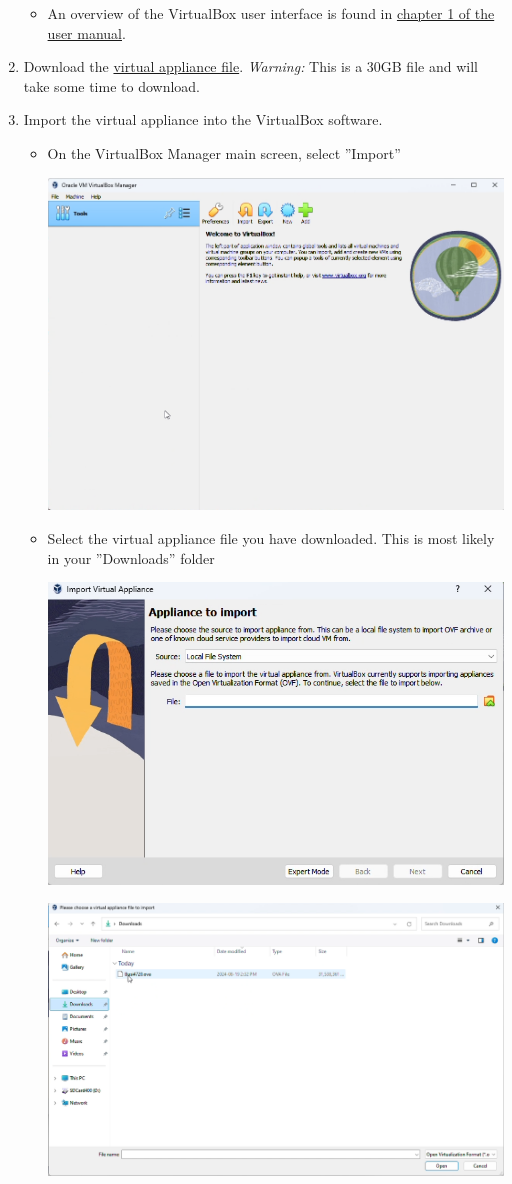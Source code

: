 \begin{enumerate}
\begin{itemize}
\begin{center}
      \end{center}
\item An overview of the VirtualBox user interface is found in \href{https://www.virtualbox.org/manual/ch01.html}{chapter 1 of the user manual}.
\end{itemize}
\item Download the \href{https://evermann.ca/Busi4720.ova}{virtual appliance file}. \emph{Warning:} This is a 30GB file and will take some time to download.
\item Import the virtual appliance into the VirtualBox software. 
   \begin{itemize}
   \item On the VirtualBox Manager main screen, select ''Import''
      \begin{center}
      \includegraphics[width=.5\textwidth]{screen12.png}
      \end{center}
   \item Select the virtual appliance file you have downloaded. This is most likely in your ''Downloads'' folder
      \begin{center}
      \includegraphics[width=.5\textwidth]{screen13.png}
      \end{center}
      \begin{center}
      \includegraphics[width=.5\textwidth]{screen14.png}

\end{center}
\end{itemize}
\end{enumerate}
